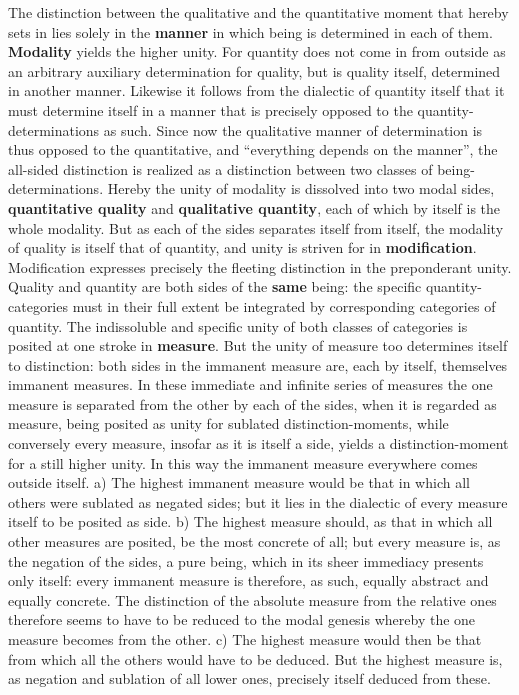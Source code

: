 \documentclass[12pt,a4paper,openany]{book}
\newcommand{\opage}[1]{\marginnote{\footnotesize\textit{[#1]}}}
\begin{document}
The distinction between the qualitative and the quantitative moment that hereby sets in lies solely in the \textbf{manner} in which being is determined in each of them. \textbf{Modality} yields the higher unity. For quantity does not come in from outside as an arbitrary auxiliary determination for quality, but is quality itself, determined in another manner. Likewise it follows from the dialectic of quantity itself that it must determine itself in a manner that is precisely opposed to the quantity-determinations as such. Since now the qualitative manner of determination is thus opposed to the quantitative, and ``everything depends on the manner'', the all-sided distinction is realized as a distinction between two classes of being-determinations. Hereby the unity of modality is dissolved into two modal sides, \textbf{quantitative quality} and \textbf{qualitative quantity}, each of which by itself is the whole modality. But as each of the sides separates itself from itself, the modality of quality is itself that of quantity, and unity is striven for in \textbf{modification}. Modification expresses precisely the fleeting distinction in the preponderant unity. Quality
\setcounter{footnote}{0}%
\opage{76}and quantity are both sides of the \textbf{same} being: the specific quantity-categories must in their full extent be integrated by corresponding categories of quantity. The indissoluble and specific unity of both classes of categories is posited at one stroke in \textbf{measure}. But the unity of measure too determines itself to distinction: both sides in the immanent measure are, each by itself, themselves immanent measures. In these immediate and infinite series of measures the one measure is separated from the other by each of the sides, when it is regarded as measure, being posited as unity for sublated distinction-moments, while conversely every measure, insofar as it is itself a side, yields a distinction-moment for a still higher unity. In this way the immanent measure everywhere comes outside itself. a) The highest immanent measure would be that in which all others were sublated as negated sides; but it lies in the dialectic of every measure itself to be posited as side. b) The highest measure should, as that in which all other measures are posited, be the most concrete of all; but every measure is, as the negation of the sides, a pure being, which in its sheer immediacy presents only itself: every immanent measure is therefore, as such, equally abstract and equally concrete. The distinction of the absolute measure from the relative ones therefore seems to have to be reduced to the modal genesis whereby the one measure becomes from the other. c) The highest measure would then be that from which all the others would have to be deduced. But the highest measure is, as negation and sublation of all lower ones, precisely itself deduced from these.
\end{document}
